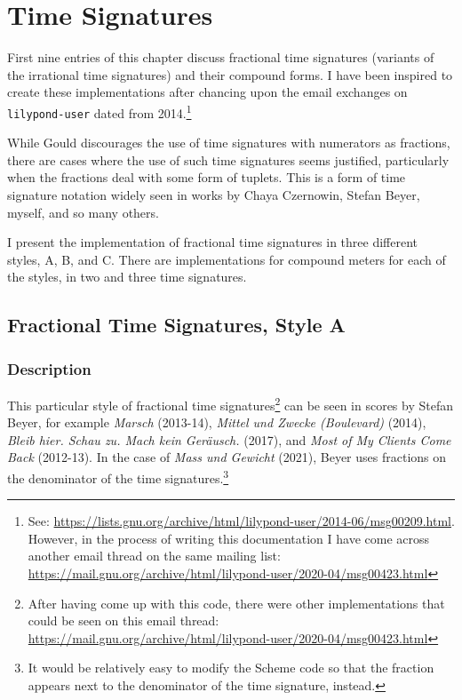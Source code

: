 
\chapter {Time Signatures}

First nine entries of this chapter discuss fractional time signatures (variants of the irrational time signatures) and their compound forms. I have been inspired to create these implementations after chancing upon the email exchanges on \verb|lilypond-user| dated from 2014.\footnote{See: \url{https://lists.gnu.org/archive/html/lilypond-user/2014-06/msg00209.html}. However, in the process of writing this documentation I have come across another email thread on the same mailing list: \url{https://mail.gnu.org/archive/html/lilypond-user/2020-04/msg00423.html} }

While Gould discourages the use of time signatures with numerators as fractions,\autocite[180]{RN1741} there are cases where the use of such time signatures seems justified, particularly when the fractions deal with some form of tuplets. This is a form of time signature notation widely seen in works by Chaya Czernowin, Stefan Beyer, myself, and so many others.

I present the implementation of fractional time signatures in three different styles, A, B, and C. There are implementations for compound meters for each of the styles, in two and three time signatures. 


\section {Fractional Time Signatures, Style A}
\label{sec:time_signatures}
\hfill
{}
\hfill

\subsection{Description}
This particular style of fractional time signatures\footnote{After having come up with this code, there were other implementations that could be seen on this email thread: \url{https://mail.gnu.org/archive/html/lilypond-user/2020-04/msg00423.html}} can be seen in scores by Stefan Beyer, for example \textit{Marsch} (2013-14),\autocite{RN1745} \textit{Mittel und Zwecke (Boulevard)} (2014),\autocite{RN1744} \textit{Bleib hier. Schau zu. Mach kein Geräusch.} (2017),\autocite{RN1743} and \textit{Most of My Clients Come Back} (2012-13).\autocite{RN1747} In the case of \textit{Mass und Gewicht} (2021), Beyer uses fractions on the denominator of the time signatures.\footnote{It would be relatively easy to modify the Scheme code so that the fraction appears next to the denominator of the time signature, instead.}

